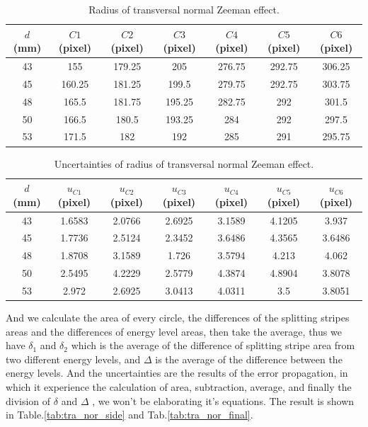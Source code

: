 \documentclass[a4paper,12pt]{article}
\begin{document}
    \begin{table}[H]
        \centering
        \caption{Radius of transversal normal Zeeman effect.}
        \begin{tabular}{c|c|c|c|c|c|c}
            $d $ (mm)& $C1 $ (pixel)& $C2 $ (pixel)& $C3 $ (pixel)& $C4 $ (pixel)& $C5 $ (pixel)& $C6 $ (pixel)\\ \hline \hline
            43&	155   &	179.25 & 205   & 276.75& 292.75&306.25 \\ \hline
            45&	160.25&	181.25 & 199.5 & 279.75& 292.75&303.75 \\ \hline
            48&	165.5 &	181.75 & 195.25& 282.75& 292   &301.5 \\ \hline
            50&	166.5 &	180.5  & 193.25& 284   & 292   &297.5 \\ \hline
            53&	171.5 &	182	   & 192   & 285   & 291   & 295.75 \\ \hline
        \end{tabular}
        \label{tab:tra_nor}
    \end{table}
    
    \begin{table}[H]
        \centering
        \caption{Uncertainties of radius of transversal normal Zeeman effect.}
        \begin{tabular}{c|c|c|c|c|c|c}
            $d $ (mm)& $u_{C1} $ (pixel)& $u_{C2} $ (pixel)& $u_{C3} $ (pixel)& $u_{C4} $ (pixel)& $u_{C5} $ (pixel)& $u_{C6} $ (pixel) \\ \hline \hline
            43&1.6583&2.0766&2.6925&3.1589&4.1205&3.937  \\ \hline
            45&1.7736&2.5124&2.3452&3.6486&4.3565&3.6486 \\ \hline
            48&1.8708&3.1589&1.726 &3.5794&4.213 &4.062  \\ \hline
            50&2.5495&4.2229&2.5779&4.3874&4.8904&3.8078 \\ \hline
            53&2.972 &2.6925&3.0413&4.0311&3.5   &3.8051 \\ \hline
        \end{tabular}
        \label{tab:tra_nor_un}
    \end{table}
    
    \par And we calculate the area of every circle, the differences of the splitting stripes areas and the differences of energy level areas, then take the average, thus we have $\delta_{1}$ and $\delta_{2}$ which is the average of the difference of splitting stripe area from two different energy levels, and $\Delta$ is the average of the difference between the energy levels. And the uncertainties are the results of the error propagation, in which it experience the calculation of area, subtraction, average, and finally the division of $\delta$ and $\Delta$ , we won't be elaborating it's equations. The result is shown in Table.\ref{tab:tra_nor_side} and Tab.\ref{tab:tra_nor_final}.
    
\end{document}
